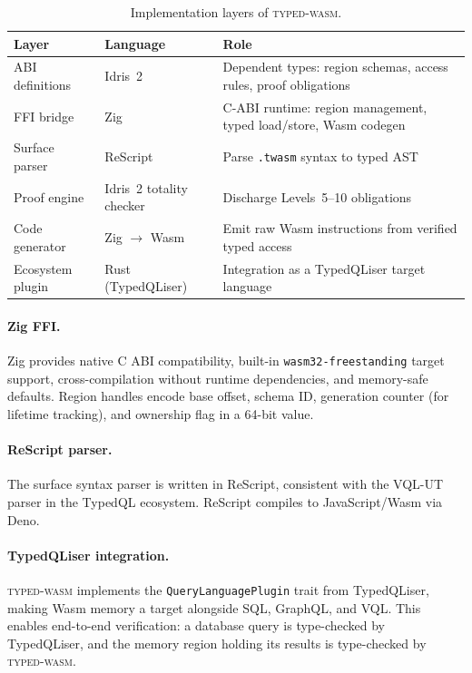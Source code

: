 \documentclass[11pt,a4paper]{article}
\newcommand{\typedwasm}{\textsc{typed-wasm}}
\begin{document}
\begin{table}[htbp]
\centering
\caption{Implementation layers of \typedwasm{}.}
\label{tab:implementation}
\begin{tabularx}{\textwidth}{@{}llX@{}}
\toprule
\textbf{Layer} & \textbf{Language} & \textbf{Role} \\
\midrule
ABI definitions & Idris~2 & Dependent types: region schemas, access rules, proof obligations \\
FFI bridge & Zig & C-ABI runtime: region management, typed load/store, Wasm codegen \\
Surface parser & ReScript & Parse \texttt{.twasm} syntax to typed AST \\
Proof engine & Idris~2 totality checker & Discharge Levels~5--10 obligations \\
Code generator & Zig $\to$ Wasm & Emit raw Wasm instructions from verified typed access \\
Ecosystem plugin & Rust (TypedQLiser) & Integration as a TypedQLiser target language \\
\bottomrule
\end{tabularx}
\end{table}

\paragraph{Zig FFI.}
Zig provides native C ABI compatibility, built-in
\lstinline{wasm32-freestanding} target support, cross-compilation without
runtime dependencies, and memory-safe defaults.  Region handles encode
base offset, schema ID, generation counter (for lifetime tracking), and
ownership flag in a 64-bit value.

\paragraph{ReScript parser.}
The surface syntax parser is written in ReScript, consistent with the
VQL-UT parser in the TypedQL ecosystem.  ReScript compiles to
JavaScript/Wasm via Deno.

\paragraph{TypedQLiser integration.}
\typedwasm{} implements the \lstinline{QueryLanguagePlugin} trait from
TypedQLiser, making Wasm memory a target alongside SQL, GraphQL, and VQL.
This enables end-to-end verification: a database query is type-checked by
TypedQLiser, and the memory region holding its results is type-checked by
\typedwasm{}.
\end{document}
